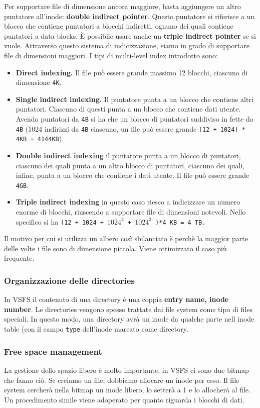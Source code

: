 \documentclass[12pt, letterpaper]{article}
\begin{document}
				Per supportare file di dimensione ancora maggiore, basta aggiungere un altro puntatore all'inode: \textbf{double indirect pointer}. Questo puntatore si riferisce a un blocco che contiene puntatori a blocchi indiretti, ognuno dei quali contiene puntatori a data blocks. È possibile usare anche un \textbf{triple indirect pointer} se si vuole. Attraverso questo sistema di indicizzazione, siamo in grado di supportare file di dimensioni maggiori. I tipi di multi-level index introdotto sono:
				\begin{itemize}
					\item \textbf{Direct indexing.} Il file può essere grande massimo 12 blocchi, ciascuno di dimensione \texttt{4K}.
					\item \textbf{Single indirect indexing.} Il puntatore punta a un blocco che contiene altri puntatori. Ciascuno di questi punta a un blocco che contiene dati utente. Avendo puntatori da \texttt{4B} si ha che un blocco di puntatori suddiviso in fette da \texttt{4B} (1024 indirizzi da \texttt{4B} ciascuno, un file può essere grande \texttt{(12 + 1024) * 4KB = 4144KB}).
					\item \textbf{Double indirect indexing} il puntatore punta a un blocco di puntatori, ciascuno dei quali punta a un altro blocco di puntatori, ciascuno dei quali, infine, punta a un blocco che contiene i dati utente. Il file può essere grande \texttt{4GB}.
					\item \textbf{Triple indirect indexing} in questo caso riesco a indicizzare un numero enorme di blocchi, riuscendo a supportare file di dimensioni notevoli. Nello specifico si ha \texttt{(12 + 1024 + $1024^2$ + $1024^3$ )*4 KB = 4 TB.}
				\end{itemize}
				Il motivo per cui si utilizza un albero così sbilanciato è perchè la maggior parte delle volte i file sono di dimensione piccola. Viene ottimizzato il caso più frequente.
			
			\subsubsection{Organizzazione delle directories}
				In VSFS il contenuto di una directory è una coppia \textbf{entry name, inode number}. Le directories vengono spesso trattate dai file system come tipo di files speciali. In questo modo, una directory avrà un inode da qualche parte nell inode table (con il campo \texttt{type} dell'inode marcato come directory.
				
			\subsubsection{Free space management}
				La gestione dello spazio libero è molto importante, in VSFS ci sono due bitmap che fanno ciò.
				Se creiamo un file, dobbiamo allocare un inode per esso. Il file system cercherà nella bitmap un inode libero, lo setterà a 1 e lo allocherà al file. Un procedimento simile viene adoperato per quanto riguarda i blocchi di dati.
				
\end{document}
